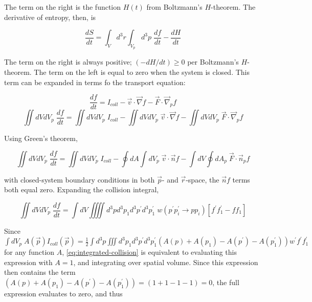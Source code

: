 \documentclass{template}
\begin{document}
The term on the right is the function $H(t)$ from Boltzmann's $H$-theorem. The derivative of entropy, then, is


\begin{equation}\label{eq:ds-dt}
    \frac{dS}{dt} =  \int_{V}d^3r\int_{V_p}d^3p\;\frac{df}{dt} - \frac{dH}{dt}
\end{equation}

The term on the right is always positive; $(-dH/dt) \geq 0$ per Boltzmann's $H$-theorem. The term on the left is equal to zero when the system is closed. This term can be expanded in terms fo the transport equation:

\begin{equation}
    \frac{df}{dt} = I_{coll} - \vec{v}\cdot\vec{\nabla}f - \vec{F}\cdot\vec{\nabla}_pf
\end{equation}
\begin{equation}
   \iint dVdV_p \; \frac{df}{dt} = \iint dVdV_p \;I_{coll} - \iint dVdV_p \;\vec{v}\cdot\vec{\nabla}f -\iint dVdV_p \; \vec{F}\cdot\vec{\nabla}_pf
\end{equation}

Using Green's theorem,

\begin{equation}
    \iint dVdV_p \; \frac{df}{dt} = \iint dVdV_p \;I_{coll} - \oint dA\int dV_p \;\vec{v}\cdot\vec{n}f -\int dV \oint dA_p \; \vec{F}\cdot\vec{n}_pf
\end{equation}

with closed-system boundary conditions in both $\vec{p}$- and $\vec{r}$-space, the $\vec{n}f$ terms both equal zero. Expanding the collision integral,

\begin{equation}\label{eq:integrated-collision}
    \iint dVdV_p \; \frac{df}{dt} = \int dV\iiiint d^3p d^3p_1 d^3p^\prime d^3p^\prime_1 \; w(p^\prime p_i^\prime \rightarrow pp_i ) \left[f^\prime f^\prime_1 - ff_1 \right]
\end{equation}

Since $\int dV_p\;A(\vec{p})I_{coll}(\vec{p}) = \frac{1}{2}\int d^3p\iiint d^3p_1 d^3p^\prime d^3p_1^\prime (A(p) + A(p_1) - A(p^\prime) - A(p^\prime_1))w^\prime f^\prime f_1^\prime$ for any function $A$, \autoref{eq:integrated-collision} is equivalent to evaluating this expression with $A = 1$, and integrating over spatial volume. Since this expression then contains the term $(A(p) + A(p_1) - A(p^\prime) - A(p^\prime_1)) = (1+1-1-1) = 0$, the full expression evaluates to zero, and thus
\end{document}
